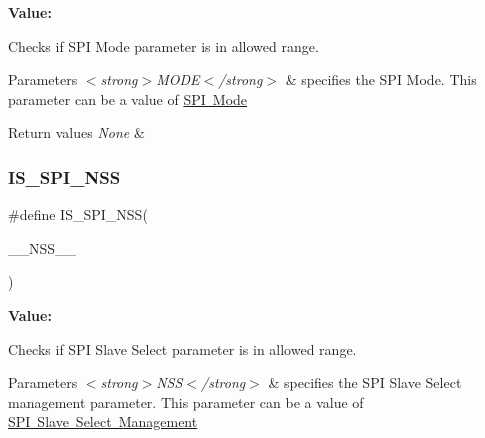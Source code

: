 {\bfseries Value\+:}
\begin{DoxyCode}{0}

\end{DoxyCode}


Checks if S\+PI Mode parameter is in allowed range. 


\begin{DoxyParams}{Parameters}
{\em $<$strong$>$\+M\+O\+D\+E$<$/strong$>$} & specifies the S\+PI Mode. This parameter can be a value of \mbox{\hyperlink{group___s_p_i___mode}{S\+PI Mode}} \\
\hline
\end{DoxyParams}

\begin{DoxyRetVals}{Return values}
{\em None} & \\
\hline
\end{DoxyRetVals}
\mbox{\label{group___s_p_i___private___macros_ga7e90530e595a47ab465e3e222014f5e3}} 
\subsubsection{\texorpdfstring{IS\_SPI\_NSS}{IS\_SPI\_NSS}}
{\footnotesize\ttfamily \#define I\+S\+\_\+\+S\+P\+I\+\_\+\+N\+SS(\begin{DoxyParamCaption}\item[{}]{\+\_\+\+\_\+\+N\+S\+S\+\_\+\+\_\+ }\end{DoxyParamCaption})}

{\bfseries Value\+:}
\begin{DoxyCode}{0}

\end{DoxyCode}


Checks if S\+PI Slave Select parameter is in allowed range. 


\begin{DoxyParams}{Parameters}
{\em $<$strong$>$\+N\+S\+S$<$/strong$>$} & specifies the S\+PI Slave Select management parameter. This parameter can be a value of \mbox{\hyperlink{group___s_p_i___slave___select__management}{S\+PI Slave Select Management}} \\
\hline
\end{DoxyParams}

